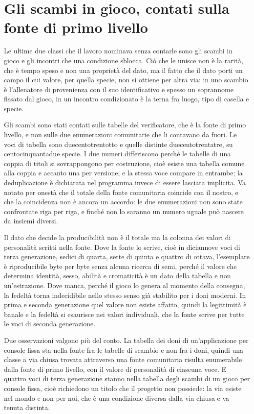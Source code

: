 \section{Gli scambi in gioco, contati sulla fonte di primo livello}

Le ultime due classi che il lavoro nominava senza contarle sono gli scambi in gioco e gli incontri che una condizione sblocca. Ciò che le unisce non è la rarità, che è tempo speso e non una proprietà del dato, ma il fatto che il dato porti un campo il cui valore, per quella specie, non si ottiene per altra via: in uno scambio è l'allenatore di provenienza con il suo identificativo e spesso un soprannome fissato dal gioco, in un incontro condizionato è la terna fra luogo, tipo di casella e specie.

Gli scambi sono stati contati sulle tabelle del verificatore, che è la fonte di primo livello, e non sulle due enumerazioni comunitarie che li contavano da fuori. Le voci di tabella sono duecentotrentotto e quelle distinte duecentotrentatre, su centocinquantadue specie. I due numeri differiscono perché le tabelle di una coppia di titoli si sovrappongono per costruzione, cioè esiste una tabella comune alla coppia e accanto una per versione, e la stessa voce compare in entrambe; la deduplicazione è dichiarata nel programma invece di essere lasciata implicita. Va notato per onestà che il totale della fonte comunitaria coincide con il nostro, e che la coincidenza non è ancora un accordo: le due enumerazioni non sono state confrontate riga per riga, e finché non lo saranno un numero uguale può nascere da insiemi diversi.

Il dato che decide la producibilità non è il totale ma la colonna dei valori di personalità scritti nella fonte. Dove la fonte lo scrive, cioè in diciannove voci di terza generazione, sedici di quarta, sette di quinta e quattro di ottava, l'esemplare è riproducibile byte per byte senza alcuna ricerca di semi, perché il valore che determina identità, sesso, abilità e cromaticità è un dato della tabella e non un'estrazione. Dove manca, perché il gioco lo genera al momento della consegna, la fedeltà torna indecidibile nello stesso senso già stabilito per i doni moderni. In prima e seconda generazione quel valore non esiste affatto, quindi la legittimità è banale e la fedeltà si esaurisce nei valori individuali, che la fonte scrive per tutte le voci di seconda generazione.

Due osservazioni valgono più del conto. La tabella dei doni di un'applicazione per console fissa sta nella fonte fra le tabelle di scambio e non fra i doni, quindi una classe a via chiusa trovata attraverso una fonte comunitaria risulta enumerabile dalla fonte di primo livello, con il valore di personalità di ciascuna voce. E quattro voci di terza generazione stanno nella tabella degli scambi di un gioco per console fissa, cioè richiedono un titolo che il progetto non possiede: la via esiste nel mondo e non per noi, che è una condizione diversa dalla via chiusa e va tenuta distinta.

